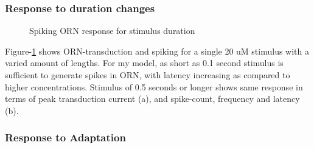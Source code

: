 \documentclass[
]{article}
\begin{document}
\hypertarget{response-to-duration-changes}{%
\subsubsection{Response to duration changes}\label{response-to-duration-changes}}

\begin{figure}

{\centering {}

}

\caption{Spiking ORN response for stimulus duration}\label{fig:rDur}
\end{figure}

Figure-\ref{fig:rDur} shows ORN-transduction and spiking for a single 20 uM stimulus with a varied amount of lengths. For my model, as short as 0.1 second stimulus is sufficient to generate spikes in ORN, with latency increasing as compared to higher concentrations. Stimulus of 0.5 seconds or longer shows same response in terms of peak transduction current (a), and spike-count, frequency and latency (b).

\hypertarget{response-to-adaptation}{%
\subsubsection{Response to Adaptation}\label{response-to-adaptation}}
\end{document}
